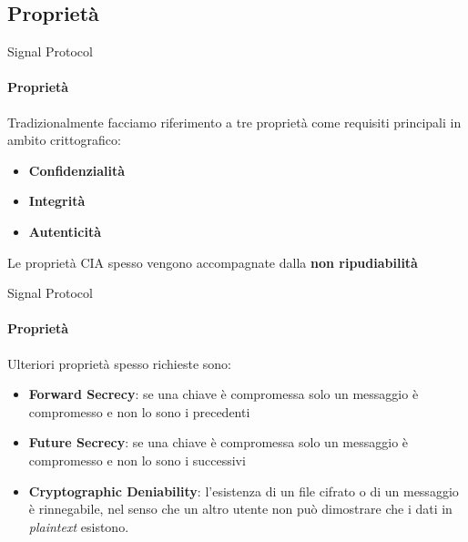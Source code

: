 \subsection{Proprietà}

\begin{frame}{Signal Protocol}
    \framesubtitle{Proprietà}
    Tradizionalmente facciamo riferimento a tre proprietà come requisiti principali in ambito crittografico:
    \begin{itemize}
        \item \textbf{Confidenzialità}
        \item \textbf{Integrità}
        \item \textbf{Autenticità}
    \end{itemize}\pause

    Le proprietà CIA spesso vengono accompagnate dalla \textbf{non ripudiabilità}

\end{frame}

\begin{frame}{Signal Protocol}
    \framesubtitle{Proprietà}
    Ulteriori proprietà spesso richieste sono:
    \begin{itemize}
        \item \textbf{Forward Secrecy}: se una chiave è compromessa solo un messaggio è compromesso e non lo sono i precedenti \pause
        \item \textbf{Future Secrecy}: se una chiave è compromessa solo un messaggio è compromesso e non lo sono i successivi \pause
        \item \textbf{Cryptographic Deniability}: l'esistenza di un file cifrato o di un messaggio è rinnegabile, nel senso che un altro utente non può dimostrare che i dati in \textit{plaintext} esistono. 
    \end{itemize}

\end{frame}

